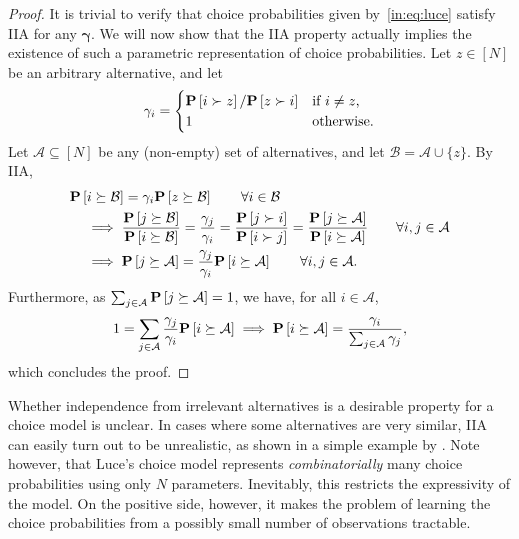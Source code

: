 \begin{proof}
It is trivial to verify that choice probabilities given by~\eqref{in:eq:luce} satisfy IIA for any $\bm{\gamma}$.
We will now show that the IIA property actually implies the existence of such a parametric representation of choice probabilities.
Let $z \in [N]$ be an arbitrary alternative, and let
\begin{align*}
\gamma_i =
\begin{cases}
\mathbf{P}\left[ i \succ z \right] / \mathbf{P}\left[ z \succ i \right] & \text{if $i \ne z$,} \\
1                                   & \text{otherwise.} \\
\end{cases}
\end{align*}
Let $\mathcal{A} \subseteq [N]$ be any (non-empty) set of alternatives, and let $\mathcal{B} = \mathcal{A} \cup \{ z \}$.
By IIA,
\begin{align*}
&\mathbf{P}\left[ i \succeq \mathcal{B} \right] = \gamma_i \mathbf{P}\left[ z \succeq \mathcal{B} \right]
    \qquad \forall i \in \mathcal{B} \\
&\quad \implies
    \frac{\mathbf{P}\left[ j \succeq \mathcal{B} \right]}{\mathbf{P}\left[ i \succeq \mathcal{B} \right]}
    = \frac{\gamma_j}{\gamma_i}
    = \frac{\mathbf{P}\left[ j \succ i \right]}{\mathbf{P}\left[ i \succ j \right]}
    = \frac{\mathbf{P}\left[ j \succeq \mathcal{A} \right]}{\mathbf{P}\left[ i \succeq \mathcal{A} \right]}
    \qquad \forall i, j \in \mathcal{A} \\
&\quad \implies \mathbf{P}\left[ j \succeq \mathcal{A} \right] = \frac{\gamma_j}{\gamma_i} \mathbf{P}\left[ i \succeq \mathcal{A} \right]
    \qquad \forall i, j \in \mathcal{A}.
\end{align*}
Furthermore, as $\sum_{j \in \mathcal{A}} \mathbf{P}\left[ j \succeq \mathcal{A} \right] = 1$, we have, for all $i \in \mathcal{A}$,
\begin{align*}
1 = \sum_{j \in \mathcal{A}} \frac{\gamma_j}{\gamma_i} \mathbf{P}\left[ i \succeq \mathcal{A} \right]
    \implies \mathbf{P}\left[ i \succeq \mathcal{A} \right] = \frac{\gamma_i}{\sum_{j \in \mathcal{A}} \gamma_j},
\end{align*}
which concludes the proof.
\end{proof}

Whether independence from irrelevant alternatives is a desirable property for a choice model is unclear.
In cases where some alternatives are very similar, IIA can easily turn out to be unrealistic, as shown in a simple example by \citet{debreu1960review}.
Note however, that Luce's choice model represents \emph{combinatorially} many choice probabilities using only $N$ parameters.
Inevitably, this restricts the expressivity of the model.
On the positive side, however, it makes the problem of learning the choice probabilities from a possibly small number of observations tractable.

